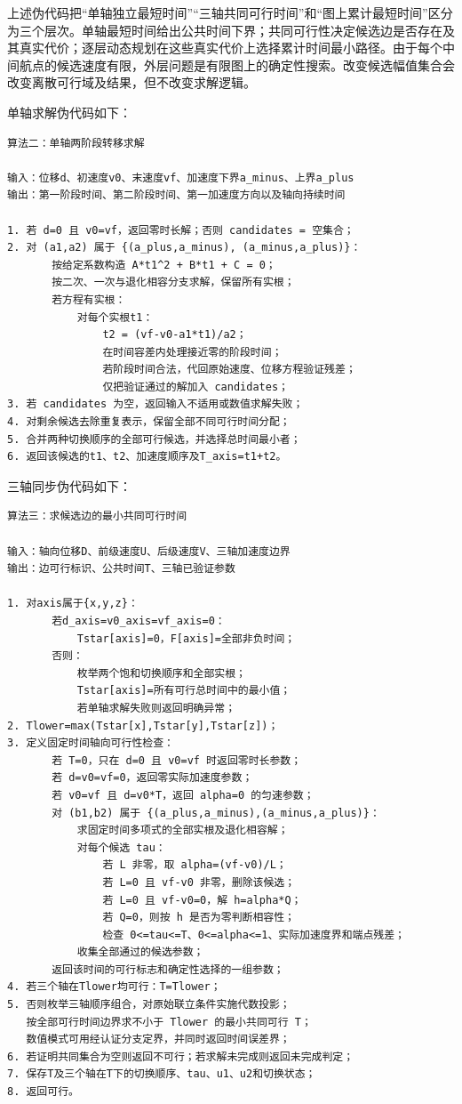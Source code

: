 \documentclass[UTF8,a4paper,12pt,fontset=fandol]{ctexart}
\begin{document}
上述伪代码把“单轴独立最短时间”“三轴共同可行时间”和“图上累计最短时间”区分为三个层次。单轴最短时间给出公共时间下界；共同可行性决定候选边是否存在及其真实代价；逐层动态规划在这些真实代价上选择累计时间最小路径。由于每个中间航点的候选速度有限，外层问题是有限图上的确定性搜索。改变候选幅值集合会改变离散可行域及结果，但不改变求解逻辑。

单轴求解伪代码如下：

\begin{lstlisting}[style=patentpseudo]
算法二：单轴两阶段转移求解

输入：位移d、初速度v0、末速度vf、加速度下界a_minus、上界a_plus
输出：第一阶段时间、第二阶段时间、第一加速度方向以及轴向持续时间

1. 若 d=0 且 v0=vf，返回零时长解；否则 candidates = 空集合；
2. 对 (a1,a2) 属于 {(a_plus,a_minus), (a_minus,a_plus)}：
       按给定系数构造 A*t1^2 + B*t1 + C = 0；
       按二次、一次与退化相容分支求解，保留所有实根；
       若方程有实根：
           对每个实根t1：
               t2 = (vf-v0-a1*t1)/a2；
               在时间容差内处理接近零的阶段时间；
               若阶段时间合法，代回原始速度、位移方程验证残差；
               仅把验证通过的解加入 candidates；
3. 若 candidates 为空，返回输入不适用或数值求解失败；
4. 对剩余候选去除重复表示，保留全部不同可行时间分配；
5. 合并两种切换顺序的全部可行候选，并选择总时间最小者；
6. 返回该候选的t1、t2、加速度顺序及T_axis=t1+t2。
\end{lstlisting}

三轴同步伪代码如下：

\begin{lstlisting}[style=patentpseudo]
算法三：求候选边的最小共同可行时间

输入：轴向位移D、前级速度U、后级速度V、三轴加速度边界
输出：边可行标识、公共时间T、三轴已验证参数

1. 对axis属于{x,y,z}：
       若d_axis=v0_axis=vf_axis=0：
           Tstar[axis]=0，F[axis]=全部非负时间；
       否则：
           枚举两个饱和切换顺序和全部实根；
           Tstar[axis]=所有可行总时间中的最小值；
           若单轴求解失败则返回明确异常；
2. Tlower=max(Tstar[x],Tstar[y],Tstar[z])；
3. 定义固定时间轴向可行性检查：
       若 T=0，只在 d=0 且 v0=vf 时返回零时长参数；
       若 d=v0=vf=0，返回零实际加速度参数；
       若 v0=vf 且 d=v0*T，返回 alpha=0 的匀速参数；
       对 (b1,b2) 属于 {(a_plus,a_minus),(a_minus,a_plus)}：
           求固定时间多项式的全部实根及退化相容解；
           对每个候选 tau：
               若 L 非零，取 alpha=(vf-v0)/L；
               若 L=0 且 vf-v0 非零，删除该候选；
               若 L=0 且 vf-v0=0，解 h=alpha*Q；
               若 Q=0，则按 h 是否为零判断相容性；
               检查 0<=tau<=T、0<=alpha<=1、实际加速度界和端点残差；
           收集全部通过的候选参数；
       返回该时间的可行标志和确定性选择的一组参数；
4. 若三个轴在Tlower均可行：T=Tlower；
5. 否则枚举三轴顺序组合，对原始联立条件实施代数投影；
   按全部可行时间边界求不小于 Tlower 的最小共同可行 T；
   数值模式可用经认证分支定界，并同时返回时间误差界；
6. 若证明共同集合为空则返回不可行；若求解未完成则返回未完成判定；
7. 保存T及三个轴在T下的切换顺序、tau、u1、u2和切换状态；
8. 返回可行。
\end{lstlisting}
\end{document}
